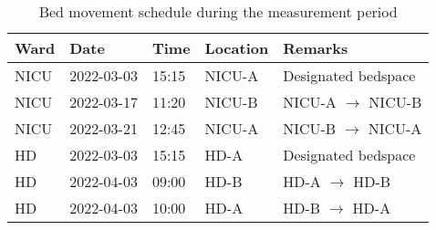 \begin{table}[ht]
    \scriptsize
    \centering
    \caption{Bed movement schedule during the measurement period}
    \label{tab:bedmovement}
    \begin{tabularx}{\linewidth}{
    lllll%
    }
    \toprule
         Ward
         & Date
         & Time 
         & Location
         & Remarks\\
    \midrule
         NICU
         & 2022-03-03
         & 15:15 
         & NICU-A
         & Designated bedspace\\

         NICU
         & 2022-03-17
         & 11:20
         & NICU-B
         & NICU-A $\rightarrow$ NICU-B\\

         NICU
         & 2022-03-21 
         & 12:45
         & NICU-A
         & NICU-B $\rightarrow$ NICU-A\\

    \midrule
        HD
         & 2022-03-03 
         & 15:15
         & HD-A
         & Designated bedspace\\

        HD
         & 2022-04-03 
         & 09:00
         & HD-B
         & HD-A $\rightarrow$ HD-B\\

        HD
         & 2022-04-03 
         & 10:00
         & HD-A
         & HD-B $\rightarrow$ HD-A\\
    \bottomrule
    
    \end{tabularx}
\end{table}